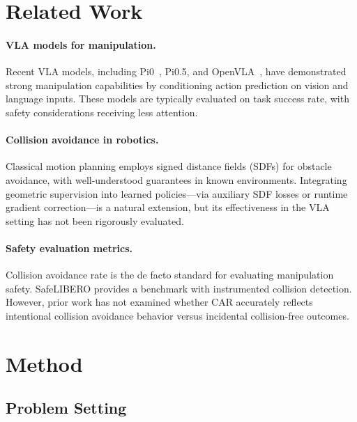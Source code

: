 \documentclass[letterpaper]{article}
\begin{document}
\section{Related Work}
\label{sec:related}

\paragraph{VLA models for manipulation.}
Recent VLA models, including Pi0~\cite{black2024pi0}, Pi0.5, and OpenVLA~\cite{kim2024openvla}, have demonstrated strong manipulation capabilities by conditioning action prediction on vision and language inputs. These models are typically evaluated on task success rate, with safety considerations receiving less attention.

\paragraph{Collision avoidance in robotics.}
Classical motion planning employs signed distance fields (SDFs) for obstacle avoidance, with well-understood guarantees in known environments. Integrating geometric supervision into learned policies---via auxiliary SDF losses or runtime gradient correction---is a natural extension, but its effectiveness in the VLA setting has not been rigorously evaluated.

\paragraph{Safety evaluation metrics.}
Collision avoidance rate is the de facto standard for evaluating manipulation safety. SafeLIBERO provides a benchmark with instrumented collision detection. However, prior work has not examined whether CAR accurately reflects intentional collision avoidance behavior versus incidental collision-free outcomes.


\section{Method}
\label{sec:method}

\subsection{Problem Setting}
\end{document}
